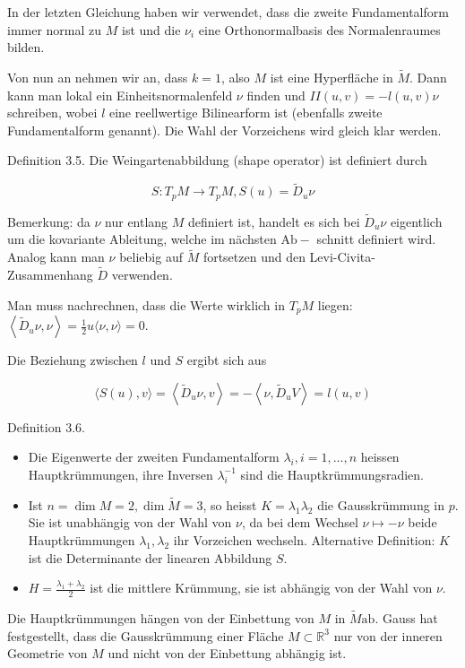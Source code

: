 \documentclass[10pt, letterpaper]{article}
\begin{document}
In der letzten Gleichung haben wir verwendet, dass die zweite Fundamentalform immer normal zu $M$ ist und die $\nu_{i}$ eine Orthonormalbasis des Normalenraumes bilden.

Von nun an nehmen wir an, dass $k=1$, also $M$ ist eine Hyperfläche in $\tilde{M}$. Dann kann man lokal ein Einheitsnormalenfeld $\nu$ finden und $I I(u, v)=-l(u, v) \nu$ schreiben, wobei $l$ eine reellwertige Bilinearform ist (ebenfalls zweite Fundamentalform genannt). Die Wahl der Vorzeichens wird gleich klar werden.

Definition 3.5. Die Weingartenabbildung (shape operator) ist definiert durch

$$
S: T_{p} M \rightarrow T_{p} M, S(u)=\tilde{D}_{u} \nu
$$

Bemerkung: da $\nu$ nur entlang $M$ definiert ist, handelt es sich bei $\tilde{D}_{u} \nu$ eigentlich um die kovariante Ableitung, welche im nächsten $\mathrm{Ab}-$ schnitt definiert wird. Analog kann man $\nu$ beliebig auf $\tilde{M}$ fortsetzen und den Levi-Civita-Zusammenhang $\tilde{D}$ verwenden.

Man muss nachrechnen, dass die Werte wirklich in $T_{p} M$ liegen: $\left\langle\tilde{D}_{u} \nu, \nu\right\rangle=\frac{1}{2} u\langle\nu, \nu\rangle=0$.

Die Beziehung zwischen $l$ und $S$ ergibt sich aus

$$
\langle S(u), v\rangle=\left\langle\tilde{D}_{u} \nu, v\right\rangle=-\left\langle\nu, \tilde{D}_{u} V\right\rangle=l(u, v)
$$

Definition 3.6.

\begin{itemize}
  \item Die Eigenwerte der zweiten Fundamentalform $\lambda_{i}, i=1, \ldots, n$ heissen Hauptkrümmungen, ihre Inversen $\lambda_{i}^{-1}$ sind die Hauptkrümmungsradien.
  \item Ist $n=\operatorname{dim} M=2, \operatorname{dim} \tilde{M}=3$, so heisst $K=\lambda_{1} \lambda_{2}$ die Gausskrümmung in $p$. Sie ist unabhängig von der Wahl von $\nu$, da bei dem Wechsel $\nu \mapsto-\nu$ beide Hauptkrümmungen $\lambda_{1}, \lambda_{2}$ ihr Vorzeichen wechseln. Alternative Definition: $K$ ist die Determinante der linearen Abbildung $S$.
  \item $H=\frac{\lambda_{1}+\lambda_{2}}{2}$ ist die mittlere Krümmung, sie ist abhängig von der Wahl von $\nu$.
\end{itemize}

Die Hauptkrümmungen hängen von der Einbettung von $M$ in $\tilde{M} \mathrm{ab}$. Gauss hat festgestellt, dass die Gausskrümmung einer Fläche $M \subset \mathbb{R}^{3}$ nur von der inneren Geometrie von $M$ und nicht von der Einbettung abhängig ist.
\end{document}
